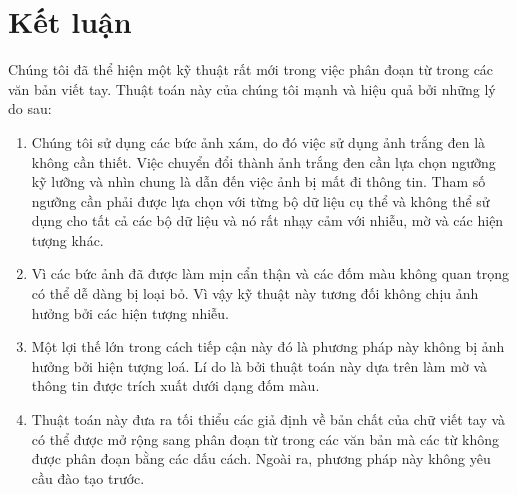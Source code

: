 \documentclass[a4paper]{article}
\begin{document}
\section{Kết luận}
Chúng tôi đã thể hiện một kỹ thuật rất mới trong việc phân đoạn từ trong các văn bản viết tay. Thuật toán này của chúng tôi mạnh và hiệu quả bởi những lý do sau:
\begin{enumerate}
    \item Chúng tôi sử dụng các bức ảnh xám, do đó việc sử dụng ảnh trắng đen là không cần thiết. Việc chuyển đổi thành ảnh trắng đen cần lựa chọn ngưỡng kỹ lưỡng và nhìn chung là dẫn đến việc ảnh bị mất đi thông tin. Tham số ngưỡng cần phải được lựa chọn với từng bộ dữ liệu cụ thể và không thể sử dụng cho tất cả các bộ dữ liệu và nó rất nhạy cảm với nhiễu, mờ và các hiện tượng khác.
    \item Vì các bức ảnh đã được làm mịn cẩn thận và các đốm màu không quan trọng có thể dễ dàng bị loại bỏ. Vì vậy kỹ thuật này tương đối không chịu ảnh hưởng bởi các hiện tượng nhiễu.
    \item Một lợi thế lớn trong cách tiếp cận này đó là phương pháp này không bị ảnh hưởng bởi hiện tượng loá. Lí do là bởi thuật toán này dựa trên làm mờ và thông tin được trích xuất dưới dạng đốm màu.
    \item Thuật toán này đưa ra tối thiểu các giả định về bản chất của chữ viết tay và có thể được mở rộng sang phân đoạn từ trong các văn bản mà các từ không được phân đoạn bằng các dấu cách. Ngoài ra, phương pháp này không yêu cầu đào tạo trước.
\end{enumerate}
\end{document}

